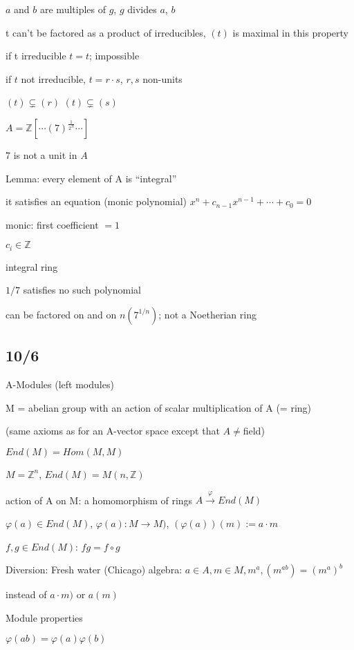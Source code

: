 \documentclass[12pt]{article}
\begin{document}
$a$ and $b$ are multiples of $g$, $g$ divides $a$, $b$

\noindent
t can't be factored as a product of irreducibles, $(t)$ is maximal in this property

\noindent
if t irreducible $t = t$; impossible

if $t$ not irreducible, $t = r \cdot s$, $r, s$ non-units

$(t) \subsetneq (r)$ $(t) \subsetneq (s)$

\noindent
$A = \mathds{Z}[\cdots (7)^{\frac{1}{2^N}} \cdots]$

7 is not a unit in $A$

\noindent
Lemma: every element of A is ``integral''

it satisfies an equation (monic polynomial) $x^n + c_{n-1}x^{n-1} + \cdots + c_0 = 0$

monic: first coefficient $= 1$

$c_i \in \mathds{Z}$

integral ring

\noindent
$1/7$ satisfies no such polynomial

 can be factored on and on $n(7^{1/n})$; not a Noetherian ring

\subsection{10/6}

\noindent
A-Modules (left modules)

M = abelian group with an action of scalar multiplication of A (= ring)

(same axioms as for an A-vector space except that $A \neq $field)

\noindent
$End(M) = Hom(M, M)$

$M = \mathds{Z}^n$, $End(M) = M(n, \mathds{Z})$

action of A on M: a homomorphism of rings $A \xrightarrow{\varphi} End(M)$

$\varphi(a) \in End(M)$, $\varphi(a): M \to M)$, $(\varphi(a))(m) := a \cdot m$

$f, g \in End(M)$: $fg = f \circ g$

\noindent
Diversion: Fresh water (Chicago) algebra: $a \in A, m \in M, m^a, (m^{ab}) = (m^a)^b$

instead of $a \cdot m)$ or $a(m)$

\noindent
Module properties

$\varphi(ab) = \varphi(a)\varphi(b)$
\end{document}

